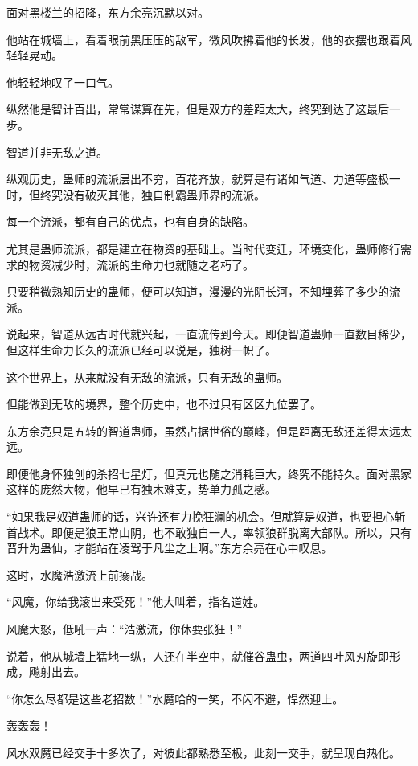 
\begin{this_body}

面对黑楼兰的招降，东方余亮沉默以对。

他站在城墙上，看着眼前黑压压的敌军，微风吹拂着他的长发，他的衣摆也跟着风轻轻晃动。

他轻轻地叹了一口气。

纵然他是智计百出，常常谋算在先，但是双方的差距太大，终究到达了这最后一步。

智道并非无敌之道。

纵观历史，蛊师的流派层出不穷，百花齐放，就算是有诸如气道、力道等盛极一时，但终究没有破灭其他，独自制霸蛊师界的流派。

每一个流派，都有自己的优点，也有自身的缺陷。

尤其是蛊师流派，都是建立在物资的基础上。当时代变迁，环境变化，蛊师修行需求的物资减少时，流派的生命力也就随之老朽了。

只要稍微熟知历史的蛊师，便可以知道，漫漫的光阴长河，不知埋葬了多少的流派。

说起来，智道从远古时代就兴起，一直流传到今天。即便智道蛊师一直数目稀少，但这样生命力长久的流派已经可以说是，独树一帜了。

这个世界上，从来就没有无敌的流派，只有无敌的蛊师。

但能做到无敌的境界，整个历史中，也不过只有区区九位罢了。

东方余亮只是五转的智道蛊师，虽然占据世俗的巅峰，但是距离无敌还差得太远太远。

即便他身怀独创的杀招七星灯，但真元也随之消耗巨大，终究不能持久。面对黑家这样的庞然大物，他早已有独木难支，势单力孤之感。

“如果我是奴道蛊师的话，兴许还有力挽狂澜的机会。但就算是奴道，也要担心斩首战术。即便是狼王常山阴，也不敢独自一人，率领狼群脱离大部队。所以，只有晋升为蛊仙，才能站在凌驾于凡尘之上啊。”东方余亮在心中叹息。

这时，水魔浩激流上前搦战。

“风魔，你给我滚出来受死！”他大叫着，指名道姓。

风魔大怒，低吼一声：“浩激流，你休要张狂！”

说着，他从城墙上猛地一纵，人还在半空中，就催谷蛊虫，两道四叶风刃旋即形成，飚射出去。

“你怎么尽都是这些老招数！”水魔哈的一笑，不闪不避，悍然迎上。

轰轰轰！

风水双魔已经交手十多次了，对彼此都熟悉至极，此刻一交手，就呈现白热化。


\end{this_body}
